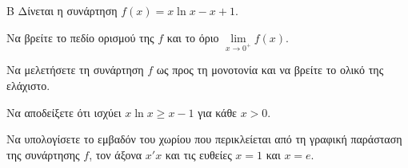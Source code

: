 \begin{thema}{Β}
Δίνεται η συνάρτηση $f(x) = x \ln x - x + 1$.
\begin{erwthma}
\item Να βρείτε το πεδίο ορισμού της $f$ και το όριο $\lim\limits_{x \to 0^+} f(x)$.
\item Να μελετήσετε τη συνάρτηση $f$ ως προς τη μονοτονία και να βρείτε το ολικό της ελάχιστο.
\item Να αποδείξετε ότι ισχύει $x \ln x \ge x - 1$ για κάθε $x > 0$.
\item Να υπολογίσετε το εμβαδόν του χωρίου που περικλείεται από τη γραφική παράσταση της συνάρτησης $f$, τον άξονα $x'x$ και τις ευθείες $x=1$ και $x=e$.
\end{erwthma}
\end{thema}
